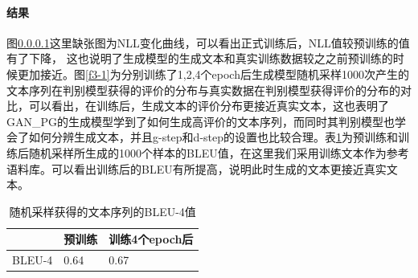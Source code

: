 \documentclass[]{template}
\begin{document}
\paragraph{结果}
图\ref{}这里缺张图为NLL变化曲线，可以看出正式训练后，NLL值较预训练的值有了下降， 这也说明了生成模型的生成文本和真实训练数据较之之前预训练的时候更加接近。图\ref{f3-1}为分别训练了1,2,4个epoch后生成模型随机采样1000次产生的文本序列在判别模型获得的评价的分布与真实数据在判别模型获得评价的分布的对比，可以看出，在训练后，生成文本的评价分布更接近真实文本，这也表明了GAN\_PG的生成模型学到了如何生成高评价的文本序列，而同时其判别模型也学会了如何分辨生成文本，并且g-step和d-step的设置也比较合理。表\ref{t3-5}为预训练和训练后随机采样所生成的1000个样本的BLEU值，在这里我们采用训练文本作为参考语料库。可以看出训练后的BLEU有所提高，说明此时生成的文本更接近真实文本。
\begin{table}[htb]
    \center
    \caption{\label{t3-5}随机采样获得的文本序列的BLEU-4值}
    \begin{tabular*}{\linewidth}{p{.33\linewidth}p{.33\linewidth}p{.33\linewidth}}
\toprule
&预训练&训练4个epoch后\\
\midrule
BLEU-4&0.64&0.67\\
\bottomrule
    \end{tabular*}
\end{table}
\end{document}
